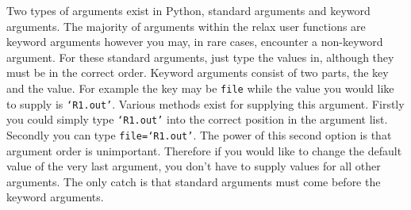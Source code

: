 \documentclass[a4paper, 11pt, twoside]{book}
\begin{document}
Two types of arguments exist in Python, standard arguments and keyword arguments.  The majority of arguments within the relax user functions are keyword arguments however you may, in rare cases, encounter a non-keyword argument.  For these standard arguments, just type the values in, although they must be in the correct order.  Keyword arguments consist of two parts, the key and the value.  For example the key may be \texttt{file} while the value you would like to supply is \texttt{`R1.out'}.  Various methods exist for supplying this argument.  Firstly you could simply type \texttt{`R1.out'} into the correct position in the argument list.  Secondly you can type \texttt{file=`R1.out'}.  The power of this second option is that argument order is unimportant.  Therefore if you would like to change the default value of the very last argument, you don't have to supply values for all other arguments.  The only catch is that standard arguments must come before the keyword arguments.


\setlength{\parindent}{0pt}
\setlength{\parskip}{2ex plus 0.5ex minus 0.2ex}

\end{document}
